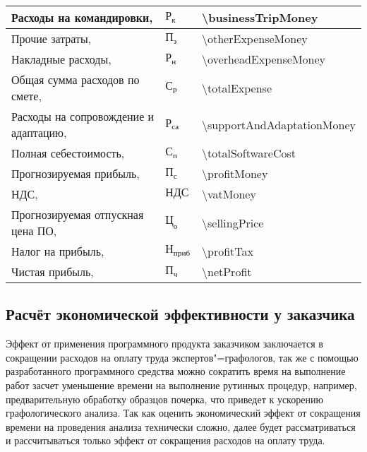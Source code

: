 \begin{longtable}{| >{\raggedright}m{}
                  | >{\centering}m{}
                  | >{\centering\arraybackslash}m{}|}
    Расходы на командировки, \byr{}
    & $ \text{Р}_\text{к} $
    & \num{\businessTripMoney}
    \\ \hline

    Прочие затраты, \byr{}
    & $ \text{П}_\text{з} $
    & \num{\otherExpenseMoney}
    \\ \hline

    Накладные расходы, \byr{}
    & $ \text{Р}_\text{н} $
    & \num{\overheadExpenseMoney}
    \\ \hline

    Общая сумма расходов по смете, \byr{}
    & $ \text{С}_\text{р} $
    & \num{\totalExpense}
    \\ \hline

    Расходы на сопровождение и адаптацию, \byr{}
    & $ \text{Р}_\text{са} $
    & \num{\supportAndAdaptationMoney}
    \\ \hline

    Полная себестоимость, \byr{}
    & $ \text{С}_\text{п} $
    & \num{\totalSoftwareCost}
    \\ \hline

    Прогнозируемая прибыль, \byr{}
    & $ \text{П}_\text{с} $
    & \num{\profitMoney}
    \\ \hline

    НДС, \byr{}
    & $ \text{НДС} $
    & \num{\vatMoney}
    \\ \hline

    Прогнозируемая отпускная цена ПО, \byr{}
    & $ \text{Ц}_\text{о} $
    & \num{\sellingPrice}
    \\ \hline

    Налог на прибыль, \byr{}
    & $ \text{Н}_\text{приб} $
    & \num{\profitTax}
    \\ \hline

    Чистая прибыль, \byr{}
    & $ \text{П}_\text{ч} $
    & \num{\netProfit}
    \\ \hline
\end{longtable}

\def \tariffFactorJuniorGraphologyAnalytic{2.48}

\subsection{Расчёт экономической эффективности у заказчика}
Эффект от применения программного продукта заказчиком заключается в сокращении расходов на оплату труда экспертов"=графологов, так же с помощью разработанного программного средства можно сократить время на выполнение работ засчет уменьшение времени на выполнение рутинных процедур, например, предварительную обработку образцов почерка, что приведет к ускорению графологического анализа. Так как оценить экономический эффект от сокращения времени на проведения анализа технически сложно, далее будет рассматриваться и рассчитываться только эффект от сокращения расходов на оплату труда.

